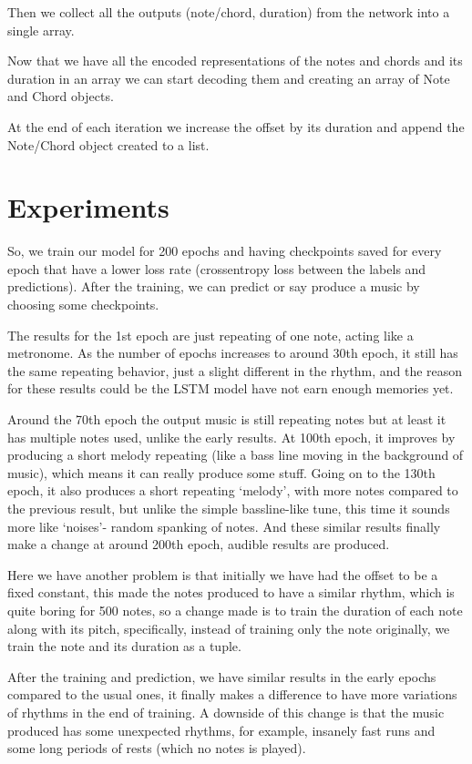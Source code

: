 \documentclass[10pt,twocolumn,letterpaper]{article}
\begin{document}
Then we collect all the outputs (note/chord, duration) from the network into a single array.

Now that we have all the encoded representations of the notes and chords and its duration in an array we can start decoding them and creating an array of Note and Chord objects.

At the end of each iteration we increase the offset by its duration and append the Note/Chord object created to a list.


\section{Experiments}
So, we train our model for 200 epochs and having checkpoints saved for every epoch that have a lower loss rate (crossentropy loss between the labels and predictions). After the training, we can predict or say produce a music by choosing some checkpoints.

The results for the 1st epoch are just repeating of one note, acting like a metronome. As the number of epochs increases to around 30th epoch, it still has the same repeating behavior, just a slight different in the rhythm, and the reason for these results could be the LSTM model have not earn enough memories yet.

Around the 70th epoch the output music is still repeating notes but at least it has multiple notes used, unlike the early results. At 100th epoch, it improves by producing a short melody repeating (like a bass line moving in the background of music), which means it can really produce some stuff.
Going on to the 130th epoch, it also produces a short repeating ‘melody’, with more notes compared to the previous result, but unlike the simple bassline-like tune, this time it sounds more like ‘noises’- random spanking of notes. And these similar results finally make a change at around 200th epoch, audible results are produced.

Here we have another problem is that initially we have had the offset to be a fixed constant, this made the notes produced to have a similar rhythm, which is quite boring for 500 notes, so a change made is to train the duration of each note along with its pitch, specifically, instead of training only the note originally, we train the note and its duration as a tuple.

After the training and prediction, we have similar results in the early epochs compared to the usual ones, it finally makes a difference to have more variations of rhythms in the end of training. A downside of this change is that the music produced has some unexpected rhythms, for example, insanely fast runs and some long periods of rests (which no notes is played).
\end{document}
